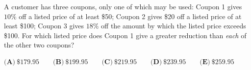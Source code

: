 A customer has three coupons, only one of which may be used: Coupon 1 gives $10\%$ off a listed price of at least \$50; Coupon 2 gives \$20 off a listed price of at least \$100; Coupon 3 gives $18\%$ off the amount by which the listed price exceeds \$100. For which listed price does Coupon 1 give a greater reduction than \emph{each} of the other two coupons?

$\textbf{(A)}\ \$179.95\qquad\textbf{(B)}\ \$199.95\qquad\textbf{(C)}\ \$219.95\qquad\textbf{(D)}\ \$239.95\qquad\textbf{(E)}\ \$259.95$
